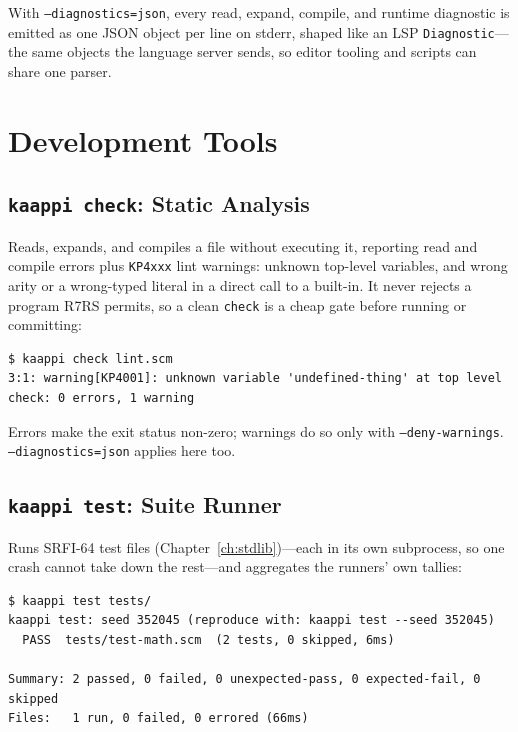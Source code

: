 With \texttt{--diagnostics=json}, every read, expand, compile, and runtime diagnostic is emitted as one JSON object per line on stderr, shaped like an LSP \texttt{Diagnostic}---the same objects the language server sends, so editor tooling and scripts can share one parser.

\section{Development Tools}
\label{sec:dev-tools}

\subsection{\texttt{kaappi check}: Static Analysis}

Reads, expands, and compiles a file without executing it, reporting read and compile errors plus \texttt{KP4xxx} lint warnings: unknown top-level variables, and wrong arity or a wrong-typed literal in a direct call to a built-in. It never rejects a program R7RS permits, so a clean \texttt{check} is a cheap gate before running or committing:

\begin{Verbatim}[fontsize=\footnotesize]
$ kaappi check lint.scm
3:1: warning[KP4001]: unknown variable 'undefined-thing' at top level
check: 0 errors, 1 warning
\end{Verbatim}

Errors make the exit status non-zero; warnings do so only with \texttt{--deny-warnings}. \texttt{--diagnostics=json} applies here too.

\subsection{\texttt{kaappi test}: Suite Runner}

Runs SRFI-64 test files (Chapter~\ref{ch:stdlib})---each in its own subprocess, so one crash cannot take down the rest---and aggregates the runners' own tallies:

\begin{Verbatim}[fontsize=\footnotesize]
$ kaappi test tests/
kaappi test: seed 352045 (reproduce with: kaappi test --seed 352045)
  PASS  tests/test-math.scm  (2 tests, 0 skipped, 6ms)

Summary: 2 passed, 0 failed, 0 unexpected-pass, 0 expected-fail, 0 skipped
Files:   1 run, 0 failed, 0 errored (66ms)
\end{Verbatim}

